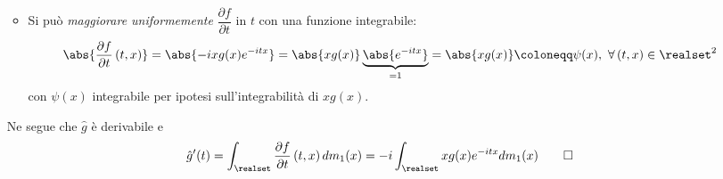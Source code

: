 \begin{demonstration}
\begin{enumerate}[label=\Roman*]
\begin{itemize}
\begin{equation*}
			\end{equation*}
			\item Si può \textit{maggiorare uniformemente} $\dfrac{\partial f}{\partial t}$ in $t$ con una funzione integrabile:
			\begin{equation*}
				\abs{\frac{\partial f}{\partial t}\left(t,x\right)}=\abs{-ixg(x)e^{-itx}}=\abs{xg(x)}\underbrace{\abs{e^{-itx}}}_{=1}=\abs{xg(x)}\coloneqq \psi(x),\ \forall \left(t,x\right)\in\realset^2
			\end{equation*}
			con $\psi(x)$ integrabile per ipotesi sull'integrabilità di $xg(x)$.
		\end{itemize}
		Ne segue che $\hat{g}$ è derivabile e
		\begin{equation*}
			\hat{g}'(t)=\int_{\realset}\frac{\partial f}{\partial t}\left(t,x\right)dm_1(x)=-i\int_{\realset}xg(x)e^{-itx}dm_1(x)\qedhere
		\end{equation*}
	\end{enumerate}
\end{demonstration}
